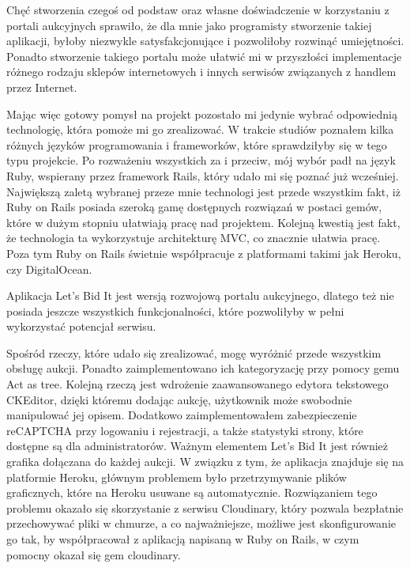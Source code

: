\documentclass[brudnopis]{xmgr}
\begin{document}

\maketitle

\introduction

Chęć stworzenia czegoś od podstaw oraz własne doświadczenie w korzystaniu z portali aukcyjnych sprawiło, że dla mnie jako programisty stworzenie takiej aplikacji, byłoby niezwykle satysfakcjonujące i pozwoliłoby rozwinąć umiejętności. Ponadto stworzenie takiego portalu może ułatwić mi w przyszłości implementacje różnego rodzaju sklepów internetowych i innych serwisów związanych z handlem przez Internet.

Mając więc gotowy pomysł na projekt pozostało mi jedynie wybrać odpowiednią technologię, która pomoże mi go zrealizować. W trakcie studiów poznałem kilka różnych języków programowania i frameworków, które sprawdziłyby się w tego typu projekcie. Po rozważeniu wszystkich za i przeciw, mój wybór padł na język Ruby, wspierany przez framework Rails, który udało mi się poznać już wcześniej. Największą zaletą wybranej przeze mnie technologi jest przede wszystkim fakt, iż Ruby on Rails posiada szeroką gamę dostępnych rozwiązań w postaci gemów, które w dużym stopniu ułatwiają pracę nad projektem. Kolejną kwestią jest fakt, że technologia  ta wykorzystuje architekturę MVC, co znacznie ułatwia pracę. Poza tym Ruby on Rails świetnie współpracuje z platformami takimi jak Heroku, czy DigitalOcean. 

Aplikacja Let's Bid It jest wersją rozwojową portalu aukcyjnego, dlatego też nie posiada jeszcze wszystkich funkcjonalności, które pozwoliłyby w pełni wykorzystać potencjał serwisu.

Spośród rzeczy, które udało się zrealizować, mogę wyróżnić przede wszystkim obsługę aukcji. Ponadto zaimplementowano ich kategoryzację przy pomocy gemu Act as tree. Kolejną rzeczą jest wdrożenie zaawansowanego edytora tekstowego CKEditor, dzięki któremu dodając aukcję, użytkownik może swobodnie manipulować jej opisem. Dodatkowo zaimplementowałem zabezpieczenie reCAPTCHA przy logowaniu i rejestracji, a także statystyki strony, które dostępne są dla administratorów. Ważnym elementem Let's Bid It jest również grafika dołączana do każdej aukcji. W związku z tym, że aplikacja znajduje się na platformie Heroku, głównym problemem było przetrzymywanie plików graficznych, które na Heroku usuwane są automatycznie. Rozwiązaniem tego problemu okazało się skorzystanie z serwisu Cloudinary, który pozwala bezpłatnie przechowywać pliki w chmurze, a co najważniejsze, możliwe jest skonfigurowanie go tak, by współpracował z aplikacją napisaną w Ruby on Rails, w czym pomocny okazał się gem cloudinary.
\end{document}
